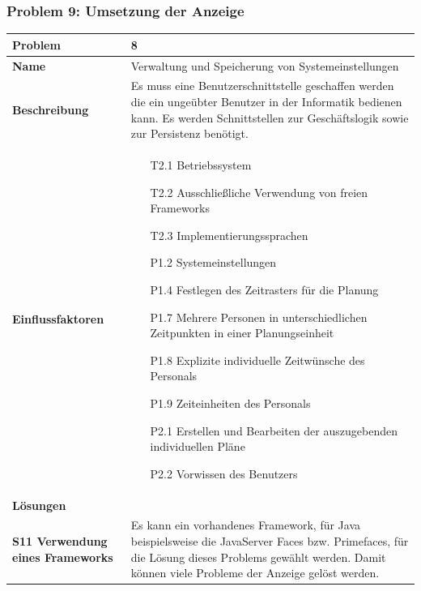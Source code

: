 \documentclass[fontsize=12pt,paper=a4,twoside]{scrartcl}
\begin{document}
\subsubsection{Problem 9: Umsetzung der Anzeige}
\begin{tabularx}{\textwidth}{|p{6cm}|X|}
 \hline
 \textbf{Problem} & 8\\\hline
 \textbf{Name} & Verwaltung und Speicherung von Systemeinstellungen\\\hline 
 \textbf{Beschreibung} & 
Es muss eine Benutzerschnittstelle geschaffen werden die ein ungeübter Benutzer in der Informatik bedienen kann. Es werden Schnittstellen zur Geschäftslogik sowie zur Persistenz benötigt. \\\hline
 \textbf{Einflussfaktoren} &
 \begin{itemize}
\item[T2.1] Betriebssystem
\item[T2.2] Ausschließliche Verwendung von freien Frameworks
\item[T2.3] Implementierungssprachen
\item[P1.2] Systemeinstellungen
\item[P1.4] Festlegen des Zeitrasters für die Planung
\item[P1.7] Mehrere Personen in unterschiedlichen Zeitpunkten in einer Planungseinheit
\item[P1.8] Explizite individuelle Zeitwünsche des Personals
\item[P1.9] Zeiteinheiten des Personals
\item[P2.1] Erstellen und Bearbeiten der auszugebenden individuellen Pläne
\item[P2.2] Vorwissen des Benutzers
 \end{itemize}\\\hline
\multicolumn{2}{|l|}{\textbf{Lösungen}} \\\hline
\textbf{S11 Verwendung eines Frameworks} & Es kann ein vorhandenes Framework, für Java beispielsweise die JavaServer Faces bzw. Primefaces, für die Lösung dieses Problems gewählt werden. Damit können viele Probleme der Anzeige gelöst werden.\\\hline
\end{tabularx}
\newpage
\end{document}

